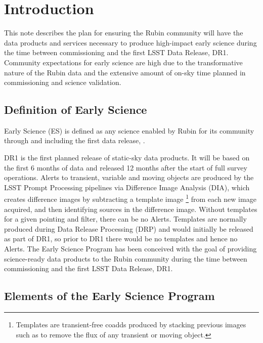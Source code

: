 \section{Introduction}

This note describes the plan for ensuring the Rubin community will have the data products and services necessary to produce high-impact early science during the time between commissioning and the first LSST Data Release, DR1.  
Community expectations for early science are high due to the transformative nature of the Rubin data and the extensive amount of on-sky time planned in commissioning and science validation.

\subsection{Definition of Early Science}  \label{ssec:defn}

Early Science (ES) is defined as any science enabled by Rubin for its community through and including the first data release, \drone.

DR1 is the first planned release of static-sky data products. 
It will be based on the first 6 months of data and released 12 months after the start of full survey operations.  
Alerts to transient, variable and moving objects are produced by the LSST Prompt Processing pipelines via Difference Image Analysis (DIA), which creates difference images by subtracting a template image \footnote{Templates are transient-free coadds produced by stacking previous images such as to remove the flux of any transient or moving object.} from each new image acquired, and then identifying sources in the difference image. 
Without templates for a given pointing and filter, there can be no Alerts.
Templates are normally produced during Data Release Processing (DRP) and would initially be released as part of DR1, so prior to DR1 there would be no templates and hence no Alerts.
The Early Science Program has been conceived with the goal of providing science-ready data products to the Rubin community during the time between commissioning and the first LSST Data Release, DR1.

\subsection{Elements of the Early Science Program}

